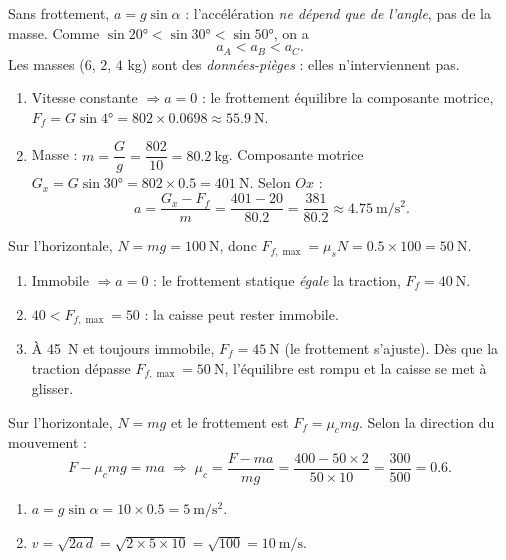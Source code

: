 \documentclass[11pt,a4paper]{article}
\begin{document}

\begin{corrige}
Sans frottement, $a=g\sin\alpha$ : l'accélération \emph{ne dépend que de l'angle}, pas de la masse.
Comme $\sin\ang{20}<\sin\ang{30}<\sin\ang{50}$, on a
\[ a_A<a_B<a_C. \]
Les masses ($6$, $2$, $4$ kg) sont des \emph{données-pièges} : elles n'interviennent pas.
\end{corrige}

\begin{corrige}
\begin{enumerate}[label=\alph*)]
  \item Vitesse constante $\Rightarrow a=0$ : le frottement équilibre la composante motrice,
        $F_f=G\sin\ang{4}=802\times\num{0,0698}\approx\qty{55,9}{\newton}$.
  \item Masse : $m=\dfrac{G}{g}=\dfrac{802}{10}=\qty{80,2}{\kilogram}$. Composante motrice
        $G_x=G\sin\ang{30}=802\times\num{0,5}=\qty{401}{\newton}$. Selon $Ox$ :
        \[ a=\frac{G_x-F_f}{m}=\frac{401-20}{\num{80,2}}=\frac{381}{\num{80,2}}\approx\qty{4,75}{\metre\per\second\squared}. \]
\end{enumerate}
\end{corrige}

\begin{corrige}
Sur l'horizontale, $N=mg=\qty{100}{\newton}$, donc $F_{f,\max}=\mu_s N=\num{0,5}\times100=\qty{50}{\newton}$.
\begin{enumerate}[label=\alph*)]
  \item Immobile $\Rightarrow a=0$ : le frottement statique \emph{égale} la traction, $F_f=\qty{40}{\newton}$.
  \item $40<F_{f,\max}=50$ : la caisse peut rester immobile. \checkmark
  \item À \qty{45}{\newton} et toujours immobile, $F_f=\qty{45}{\newton}$ (le frottement s'ajuste). Dès que la
        traction dépasse $F_{f,\max}=\qty{50}{\newton}$, l'équilibre est rompu et la caisse se met à glisser.
\end{enumerate}
\end{corrige}

\begin{corrige}
Sur l'horizontale, $N=mg$ et le frottement est $F_f=\mu_c mg$. Selon la direction du mouvement :
\[ F-\mu_c mg=ma \;\Rightarrow\; \mu_c=\frac{F-ma}{mg}=\frac{400-50\times2}{50\times10}
   =\frac{300}{500}=\num{0,6}. \]
\end{corrige}

\begin{corrige}
\begin{enumerate}[label=\alph*)]
  \item $a=g\sin\alpha=10\times\num{0,5}=\qty{5}{\metre\per\second\squared}$.
  \item $v=\sqrt{2a\,d}=\sqrt{2\times5\times10}=\sqrt{100}=\qty{10}{\metre\per\second}$.
\end{enumerate}
\end{corrige}
\end{document}
